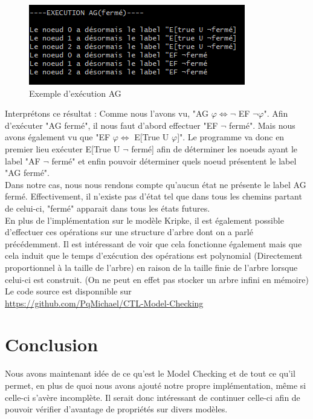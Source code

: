 \documentclass[runningheads,a4paper]{llncs}
\begin{document}
\begin{figure}[!h]
	\includegraphics[scale=0.8]{executionExemple.png}
	\centering
	\caption{Exemple d'exécution AG}
	\label{label-image9}
\end{figure}

\noindent Interprétons ce résultat : Comme nous l'avons vu, "AG $\varphi \Leftrightarrow \lnot$ EF $\lnot \varphi$". Afin d'exécuter "AG fermé", il nous faut d'abord effectuer "EF $\lnot$ fermé". Mais nous avons également vu que "EF $\varphi \Leftrightarrow$ E[True U $\varphi$]". Le programme va donc en premier lieu exécuter E[True U $\lnot$ fermé] afin de déterminer les noeuds ayant le label "AF $\lnot$ fermé" et enfin pouvoir déterminer quels noeud présentent le label "AG fermé".\\
\noindent Dans notre cas, nous nous rendons compte qu'aucun état ne présente le label AG fermé. Effectivement, il n'existe pas d'état tel que dans tous les chemins partant de celui-ci, "fermé" apparait dans tous les états futures.\\

\noindent En plus de l'implémentation sur le modèle Kripke, il est également possible d'effectuer ces opérations sur une structure d'arbre dont on a parlé précédemment. Il est intéressant de voir que cela fonctionne également mais que cela induit que le temps d'exécution des opérations est polynomial (Directement proportionnel à la taille de l'arbre) en raison de la taille finie de l'arbre lorsque celui-ci est construit. (On ne peut en effet pas stocker un arbre infini en mémoire)\\

\noindent Le code source est disponnible sur \\ \url{https://github.com/PqMichael/CTL-Model-Checking}

\section{Conclusion}

Nous avons maintenant idée de ce qu'est le Model Checking et de tout ce qu'il permet, en plus de quoi nous avons ajouté notre propre implémentation, même si celle-ci s'avère incomplète. Il serait donc intéressant de continuer celle-ci afin de pouvoir vérifier d'avantage de propriétés sur divers modèles. \\
\end{document}
